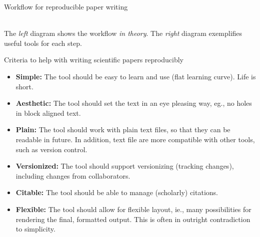 \documentclass[final,hyperref={pdfpagelabels=false}]{beamer}
\begin{document}
\begin{frame}{}
\begin{columns}[t]
\begin{column}{.48\linewidth}
\begin{block}{Workflow for reproducible paper writing}
\begin{minipage}[t]{0.50\textwidth}
     \end{minipage}	
     \\
    The \emph{left} diagram shows the workflow \emph{in theory}. The \emph{right} diagram exemplifies useful tools for each step.      
    \end{block}





        \begin{block}{Criteria to help with writing scientific papers reproducibly}
         \begin{itemize}
          \item \textbf{Simple:} The tool should be easy to learn and use (flat learning curve). Life is short.
          \item \textbf{Aesthetic:} The tool should set the text in an eye pleasing way, eg., no holes in block aligned text.
	   \item \textbf{Plain:} The tool should work with plain text files, so that they can be readable in future. In addition, text file are more compatible with other tools, such as version control. 
         \item \textbf{Versionized:} The tool  should support versionizing (tracking changes), including changes from collaborators.
         \item \textbf{Citable:} The tool should be able to manage (scholarly) citations.
         \item \textbf{Flexible:} The tool should allow for flexible layout, ie., many possibilities for rendering the final, formatted output. This is often in outright contradiction to simplicity.
	

\end{itemize}
\end{block}
\end{column}
\end{columns}
\end{frame}
\end{document}
